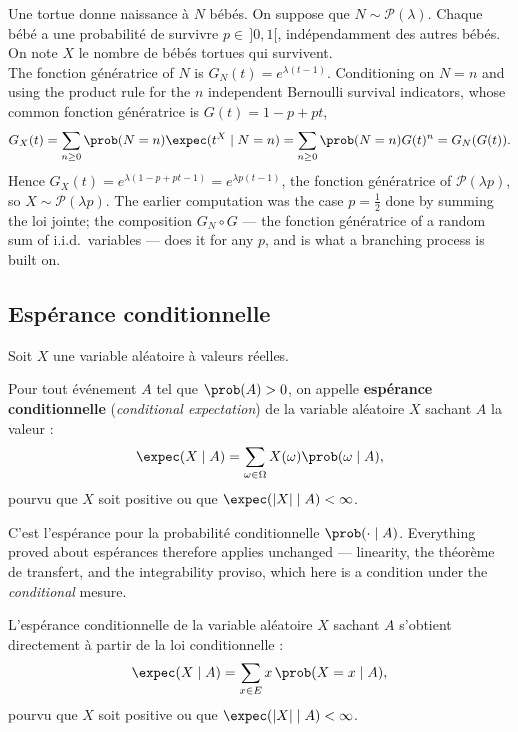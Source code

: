 \begin{example}
  Une tortue donne naissance à $N$ bébés. On suppose que
  $N \sim \mathcal{P}(\lambda)$. Chaque bébé a une probabilité de survivre
  $p \in\, ]0,1[$, indépendamment des autres bébés. On note $X$ le nombre de
  bébés tortues qui survivent.\\

  The fonction génératrice of $N$ is $G_{N}(t) = e^{\lambda(t-1)}$. Conditioning
  on $N = n$ and using the product rule for the $n$ independent Bernoulli
  survival indicators, whose common fonction génératrice is $G(t) = 1 - p + pt$,
  \[ G_{X}(t) = \sum_{n \ge 0} \prob(N=n) \expec(t^{X} \mid N = n)
       = \sum_{n \ge 0} \prob(N=n) G(t)^{n}
       = G_{N}(G(t)). \]
  Hence $G_{X}(t) = e^{\lambda(1-p+pt-1)} = e^{\lambda p (t-1)}$, the fonction
  génératrice of $\mathcal{P}(\lambda p)$, so $X \sim \mathcal{P}(\lambda p)$. The
  earlier computation was the case $p = \tfrac12$ done by summing the loi
  jointe; the composition $G_{N} \circ G$ --- the fonction génératrice of a random
  sum of i.i.d.\ variables --- does it for any $p$, and is what a branching
  process is built on.
\end{example}

\subsection{Espérance conditionnelle}

Soit $X$ une variable aléatoire à valeurs réelles.

\begin{definition}
  Pour tout événement $A$ tel que $\prob(A) > 0$, on appelle \textbf{espérance
  conditionnelle} (\textit{conditional expectation}) de la variable aléatoire
  $X$ sachant $A$ la valeur :
  \[ \expec(X \mid A) = \sum_{\omega \in \Omega} X(\omega) \prob(\omega \mid A), \]
  pourvu que $X$ soit positive ou que $\expec(|X| \mid A) < \infty$.
\end{definition}

C'est l'espérance pour la probabilité conditionnelle $\prob(\cdot \mid A)$.
Everything proved about espérances therefore applies unchanged --- linearity,
the théorème de transfert, and the integrability proviso, which here is a
condition under the \emph{conditional} mesure.

\begin{prop}
  L'espérance conditionnelle de la variable aléatoire $X$ sachant $A$ s'obtient
  directement à partir de la loi conditionnelle :
  \[ \expec(X \mid A) = \sum_{x \in E} x\, \prob(X = x \mid A), \]
  pourvu que $X$ soit positive ou que $\expec(|X| \mid A) < \infty$.
\end{prop}

